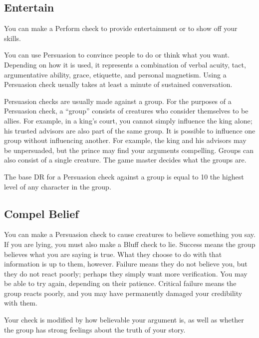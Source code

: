     \subsection{Entertain}
        You can make a Perform check to provide entertainment or to show off your skills.

        You can use Persuasion to convince people to do or think what you want. Depending on how it is used, it represents a combination of verbal acuity, tact, argumentative ability, grace, etiquette, and personal magnetism. Using a Persuasion check usually takes at least a minute of sustained conversation.

        Persuasion checks are usually made against a group. For the purposes of a Persuasion check, a ``group'' consists of creatures who consider themselves to be allies. For example, in a king's court, you cannot simply influence the king alone; his trusted advisors are also part of the same group. It is possible to influence one group without influencing another. For example, the king and his advisors may be unpersuaded, but the prince may find your arguments compelling. Groups can also consist of a single creature. The game master decides what the groups are.

        The base DR for a Persuasion check against a group is equal to 10 \add the highest level of any character in the group.

    \subsection{Compel Belief}
        You can make a Persuasion check to cause creatures to believe something you say. If you are lying, you must also make a Bluff check to lie. Success means the group believes what you are saying is true. What they choose to do with that information is up to them, however. Failure means they do not believe you, but they do not react poorly; perhaps they simply want more verification. You may be able to try again, depending on their patience. Critical failure means the group reacts poorly, and you may have permanently damaged your credibility with them.

        Your check is modified by how believable your argument is, as well as whether the group has strong feelings about the truth of your story.

